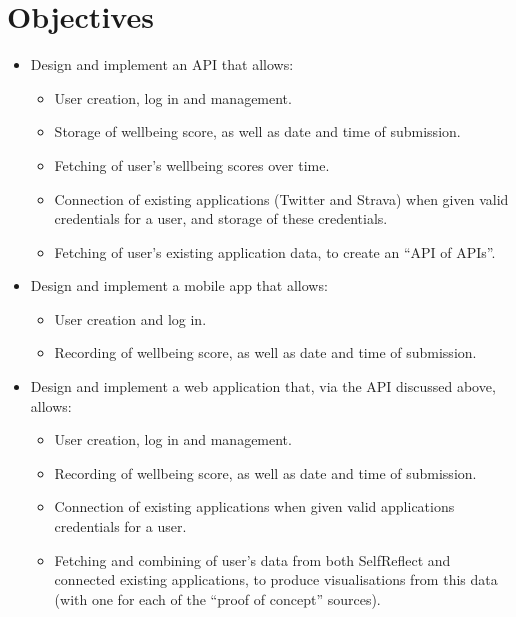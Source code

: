 \documentclass[11pt,openright,a4paper]{report}
\begin{document}
\section{Objectives} \label{objectives}
\begin{itemize}

\item Design and implement an API that allows:
\begin{itemize}
  \item User creation, log in and management.
  \item Storage of wellbeing score, as well as date and time of submission.
  \item Fetching of user's wellbeing scores over time.
  \item Connection of existing applications (Twitter and Strava) when given valid credentials for a user, and storage of these credentials.
  \item Fetching of user's existing application data, to create an \enquote{API of APIs}.
\end{itemize} 
  
\item Design and implement a mobile app that allows:
\begin{itemize}
  \item User creation and log in.
  \item Recording of wellbeing score, as well as date and time of submission.
\end{itemize}

\item Design and implement a web application that, via the API discussed above, allows:
\begin{itemize}
  \item User creation, log in and management.
  \item Recording of wellbeing score, as well as date and time of submission.
  \item Connection of existing applications when given valid applications credentials for a user.
  \item Fetching and combining of user's data from both SelfReflect and connected existing applications, to produce visualisations from this data (with one for each of the \enquote{proof of concept} sources).
\end{itemize} 


\end{itemize}
\end{document}
